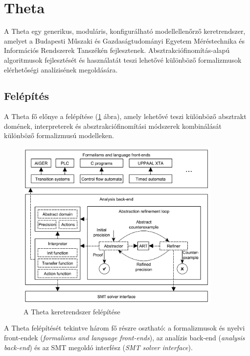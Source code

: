\section{Theta} \label{theta}
A Theta \cite{Theta} egy generikus, moduláris, konfigurálható modellellenőrző keretrendszer, amelyet a Budapesti Műszaki és Gazdaságtudományi Egyetem Méréstechnika és Információs Rendszerek Tanszékén fejlesztenek. Absztrakciófinomítás-alapú algoritmusok fejlesztését és használatát teszi lehetővé különböző formalizmusok elérhetőségi analízisének megoldására.

\subsection{Felépítés} \label{Theta:felepites}

A Theta fő előnye a felépítése (\ref{fig:theta} ábra), amely lehetővé teszi különböző absztrakt domének, interpreterek és absztrakciófinomítási módszerek kombinálását különböző formalizmusú modelleken.

\begin{figure}
    \centering
    \includegraphics[width=0.9\textwidth, keepaspectratio]{figures/theta.png}
    \caption{A Theta keretrendszer felépítése \cite{Theta}}
    \label{fig:theta}
\end{figure}

A Theta felépítését tekintve három fő részre osztható: a formalizmusok és nyelvi front-endek (\emph{formalisms and language front-ends}), az analízis back-end (\emph{analysis back-end}) és az SMT megoldó interfész (\emph{SMT solver interface}).

